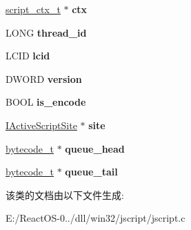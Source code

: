 \begin{DoxyCompactItemize}
\mbox{\label{struct_j_script_ad17048f0d46cf661f098d314d21b72c9}} 
\hyperlink{struct__script__ctx__t}{script\+\_\+ctx\+\_\+t} $\ast$ {\bfseries ctx}
\item 
\mbox{\label{struct_j_script_adb9fbd463cd7a3da2c05bef7c61bb950}} 
L\+O\+NG {\bfseries thread\+\_\+id}
\item 
\mbox{\label{struct_j_script_a340bb4c874896045b9aecff08844e10a}} 
L\+C\+ID {\bfseries lcid}
\item 
\mbox{\label{struct_j_script_a2cfea8afd0e0f7ff1ffd02bc09825475}} 
D\+W\+O\+RD {\bfseries version}
\item 
\mbox{\label{struct_j_script_a73f73c425c483e1e8e1a14fd9f1328e7}} 
B\+O\+OL {\bfseries is\+\_\+encode}
\item 
\mbox{\label{struct_j_script_ad5ee57dd5d11c05ab8c8fbd1d3827bba}} 
\hyperlink{interface_i_active_script_site}{I\+Active\+Script\+Site} $\ast$ {\bfseries site}
\item 
\mbox{\label{struct_j_script_aed4cdce700eb25115459e262f1af0bc0}} 
\hyperlink{struct__bytecode__t}{bytecode\+\_\+t} $\ast$ {\bfseries queue\+\_\+head}
\item 
\mbox{\label{struct_j_script_a497e89a8da6f09d10d6bf8090fef5725}} 
\hyperlink{struct__bytecode__t}{bytecode\+\_\+t} $\ast$ {\bfseries queue\+\_\+tail}
\end{DoxyCompactItemize}


该类的文档由以下文件生成\+:\begin{DoxyCompactItemize}
\item 
E\+:/\+React\+O\+S-\/0../dll/win32/jscript/jscript.\+c\end{DoxyCompactItemize}
